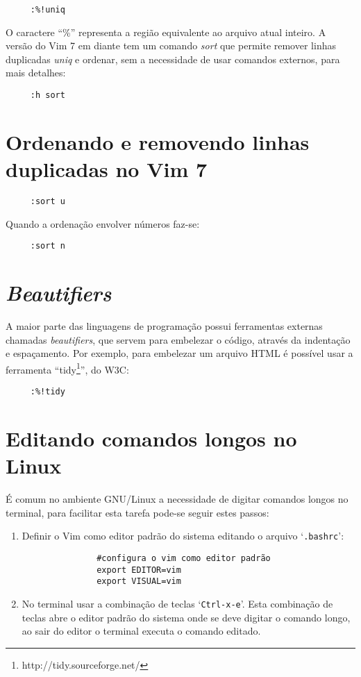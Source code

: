 \begin{verbatim}
     :%!uniq
\end{verbatim}

O caractere ``\%'' representa a região equivalente ao arquivo atual inteiro.
A versão do Vim 7 em diante tem um comando {\em sort} que permite remover
linhas duplicadas {\em uniq} e ordenar, sem a necessidade de usar comandos
externos, para mais detalhes:

\begin{verbatim}
     :h sort
\end{verbatim}

\section{Ordenando e removendo linhas duplicadas no Vim 7}

\begin{verbatim}
     :sort u
\end{verbatim}

Quando a ordenação envolver números faz-se:

\begin{verbatim}
     :sort n
\end{verbatim}

\section{{\em Beautifiers}}

A maior parte das linguagens de programação possui ferramentas
externas chamadas {\em beautifiers}, que servem para embelezar o código,
através da indentação e espaçamento. Por exemplo, para embelezar um
arquivo HTML é possível usar a ferramenta ``tidy\footnote{http://tidy.sourceforge.net/}'', do W3C:

\begin{verbatim}
     :%!tidy
\end{verbatim}

\section{Editando comandos longos no Linux}
\label{Editando comandos longos no Linux}

É comum no ambiente GNU/Linux a necessidade de digitar comandos longos
no terminal, para facilitar esta tarefa pode-se seguir estes passos:

\begin{enumerate}
     \item Definir o Vim como editor padrão do sistema editando 
           o arquivo `{\tt .bashrc}':
           \begin{verbatim}
               #configura o vim como editor padrão
               export EDITOR=vim
               export VISUAL=vim
            \end{verbatim}
      \item No terminal usar a combinação de teclas `{\tt Ctrl-x-e}'.
            Esta combinação de teclas abre o editor padrão do sistema
            onde se deve digitar o comando longo, ao sair do editor 
            o terminal executa o comando editado.
\end{enumerate}

